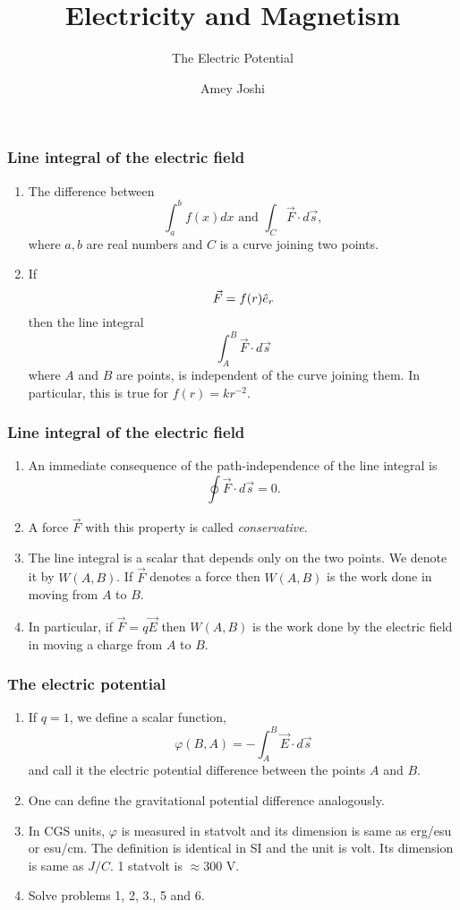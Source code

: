 \documentclass{beamer}
\title{Electricity and Magnetism}
\subtitle{The Electric Potential}
\author{Amey Joshi}
\begin{document}
\frame{\titlepage}

\begin{frame}
\frametitle{Line integral of the electric field}
\begin{enumerate}
\item The difference between
\begin{equation}\label{e1}
\int_a^b f(x)dx \text{ and } \int_C \vec{F}\cdot d\vec{s},
\end{equation}
where $a, b$ are real numbers and $C$ is a curve joining two points.
\item If 
\begin{equation}\label{e2}
\vec{F} = f(r)\hat{e}_{r}
\end{equation}
then the line integral
\begin{equation}\label{e3}
\int_A^B \vec{F}\cdot d\vec{s}
\end{equation}
where $A$ and $B$ are points, is independent of the curve joining them. In
particular, this is true for $f(r) = kr^{-2}$.
\end{enumerate}
\end{frame}

\begin{frame}
\frametitle{Line integral of the electric field}
\begin{enumerate}
\item An immediate consequence of the path-independence of the line integral is
\begin{equation}\label{e4}
\oint\vec{F}\cdot d\vec{s} = 0.
\end{equation}
\item A force $\vec{F}$ with this property is called \emph{conservative}.
\item The line integral is a scalar that depends only on the two points.
We denote it by $W(A, B)$. If $\vec{F}$ denotes a force then $W(A, B)$ is the
work done in moving from $A$ to $B$.
\item In particular, if $\vec{F} = q\vec{E}$ then $W(A, B)$ is the work done
by the electric field in moving a charge from $A$ to $B$.
\end{enumerate}
\end{frame}

\begin{frame}
\frametitle{The electric potential}
\begin{enumerate}
\item If $q = 1$, we define a scalar function,
\begin{equation}\label{e5}
\varphi(B, A) = -\int_A^B\vec{E}\cdot d\vec{s}
\end{equation}
and call it the electric potential difference between the points $A$ and $B$.
\item One can define the gravitational potential difference analogously.
\item In CGS units, $\varphi$ is measured in statvolt and its dimension is same
as erg/esu or esu/cm. The definition is identical in SI and the unit is volt.
Its dimension is same as $J/C$. 1 statvolt is $\approx 300$ V.
\item Solve problems 1, 2, 3., 5 and 6.
\end{enumerate}
\end{frame}
\end{document}
